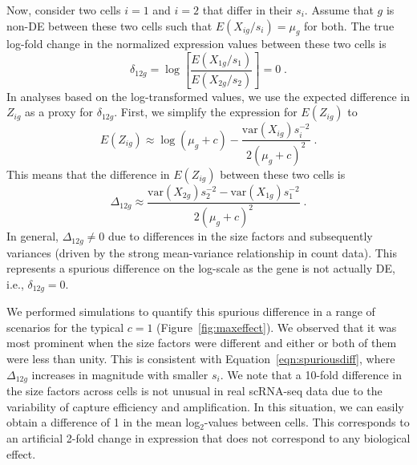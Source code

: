 \documentclass[10pt,letterpaper]{article}
\begin{document}
Now, consider two cells $i=1$ and $i=2$ that differ in their $s_i$.
Assume that $g$ is non-DE between these two cells such that $E(X_{ig}/s_i)=\mu_g$ for both.
The true log-fold change in the normalized expression values between these two cells is
\[
\delta_{12g} = \log\left[ \frac{E(X_{1g}/s_1)}{E(X_{2g}/s_2)} \right] = 0 \;.
\]
In analyses based on the log-transformed values, we use the expected difference in $Z_{ig}$ as a proxy for $\delta_{12g}$.
First, we simplify the expression for $E(Z_{ig})$ to
\[
E(Z_{ig}) \approx \log(\mu_g + c) - \frac{\mbox{var}(X_{ig})s_i^{-2}}{2(\mu_g + c)^2} \;.
\]
This means that the difference in $E(Z_{ig})$ between these two cells is 
\begin{equation}
\Delta_{12g} \approx \frac{\mbox{var}(X_{2g})s_2^{-2} -  \mbox{var}(X_{1g})s_1^{-2}}{2(\mu_g + c)^2} \;. \label{eqn:spuriousdiff}
\end{equation}
In general, $\Delta_{12g} \neq 0$ due to differences in the size factors and subsequently variances (driven by the strong mean-variance relationship in count data).
This represents a spurious difference on the log-scale as the gene is not actually DE, i.e., $\delta_{12g}=0$.

We performed simulations to quantify this spurious difference in a range of scenarios for the typical $c=1$ (Figure~\ref{fig:maxeffect}).
We observed that it was most prominent when the size factors were different and either or both of them were less than unity.
This is consistent with Equation~\ref{eqn:spuriousdiff}, where $\Delta_{12g}$ increases in magnitude with smaller $s_i$.
We note that a 10-fold difference in the size factors across cells is not unusual in real scRNA-seq data \cite{lun2016pooling} due to the variability of capture efficiency and amplification.
In this situation, we can easily obtain a difference of 1 in the mean log$_2$-values between cells.
This corresponds to an artificial 2-fold change in expression that does not correspond to any biological effect.
\end{document}

